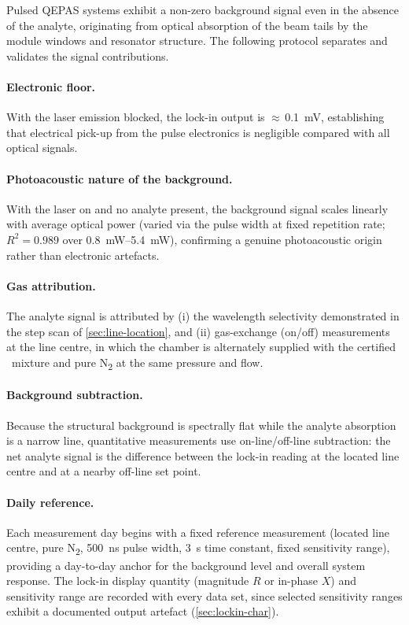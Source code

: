 Pulsed QEPAS systems exhibit a non-zero background signal even in the absence
of the analyte, originating from optical absorption of the beam tails by the
module windows and resonator structure. The following protocol separates and
validates the signal contributions.

\paragraph{Electronic floor.} With the laser emission blocked, the lock-in
output is $\approx$\,\SI{0.1}{\milli\volt}, establishing that electrical
pick-up from the pulse electronics is negligible compared with all optical
signals.

\paragraph{Photoacoustic nature of the background.} With the laser on and no
analyte present, the background signal scales linearly with average optical
power (varied via the pulse width at fixed repetition rate;
$R^2 = 0.989$ over \SIrange{0.8}{5.4}{\milli\watt}), confirming a genuine
photoacoustic origin rather than electronic artefacts.

\paragraph{Gas attribution.} The analyte signal is attributed by (i) the
wavelength selectivity demonstrated in the step scan of
\cref{sec:line-location}, and (ii) gas-exchange (on/off) measurements at the
line centre, in which the chamber is alternately supplied with the certified
\nto\ mixture and pure N\textsubscript{2} at the same pressure and flow.

\paragraph{Background subtraction.} Because the structural background is
spectrally flat while the analyte absorption is a narrow line, quantitative
measurements use on-line/off-line subtraction: the net analyte signal is the
difference between the lock-in reading at the located line centre and at a
nearby off-line set point.

\paragraph{Daily reference.} Each measurement day begins with a fixed
reference measurement (located line centre, pure N\textsubscript{2},
\SI{500}{\nano\second} pulse width, \SI{3}{\second} time constant, fixed
sensitivity range), providing a day-to-day anchor for the background level and
overall system response. The lock-in display quantity (magnitude $R$ or
in-phase $X$) and sensitivity range are recorded with every data set, since
selected sensitivity ranges exhibit a documented output artefact
(\cref{sec:lockin-char}).

